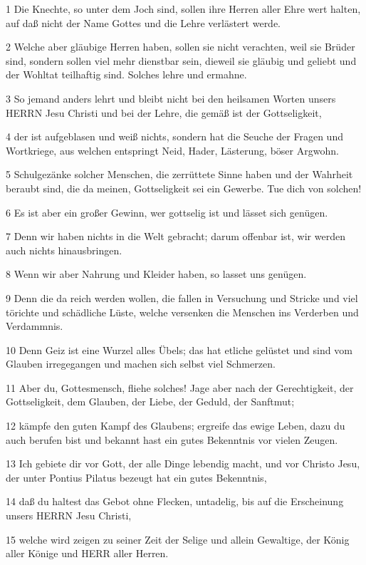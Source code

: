 \par 1 Die Knechte, so unter dem Joch sind, sollen ihre Herren aller Ehre wert halten, auf daß nicht der Name Gottes und die Lehre verlästert werde.
\par 2 Welche aber gläubige Herren haben, sollen sie nicht verachten, weil sie Brüder sind, sondern sollen viel mehr dienstbar sein, dieweil sie gläubig und geliebt und der Wohltat teilhaftig sind. Solches lehre und ermahne.
\par 3 So jemand anders lehrt und bleibt nicht bei den heilsamen Worten unsers HERRN Jesu Christi und bei der Lehre, die gemäß ist der Gottseligkeit,
\par 4 der ist aufgeblasen und weiß nichts, sondern hat die Seuche der Fragen und Wortkriege, aus welchen entspringt Neid, Hader, Lästerung, böser Argwohn.
\par 5 Schulgezänke solcher Menschen, die zerrüttete Sinne haben und der Wahrheit beraubt sind, die da meinen, Gottseligkeit sei ein Gewerbe. Tue dich von solchen!
\par 6 Es ist aber ein großer Gewinn, wer gottselig ist und lässet sich genügen.
\par 7 Denn wir haben nichts in die Welt gebracht; darum offenbar ist, wir werden auch nichts hinausbringen.
\par 8 Wenn wir aber Nahrung und Kleider haben, so lasset uns genügen.
\par 9 Denn die da reich werden wollen, die fallen in Versuchung und Stricke und viel törichte und schädliche Lüste, welche versenken die Menschen ins Verderben und Verdammnis.
\par 10 Denn Geiz ist eine Wurzel alles Übels; das hat etliche gelüstet und sind vom Glauben irregegangen und machen sich selbst viel Schmerzen.
\par 11 Aber du, Gottesmensch, fliehe solches! Jage aber nach der Gerechtigkeit, der Gottseligkeit, dem Glauben, der Liebe, der Geduld, der Sanftmut;
\par 12 kämpfe den guten Kampf des Glaubens; ergreife das ewige Leben, dazu du auch berufen bist und bekannt hast ein gutes Bekenntnis vor vielen Zeugen.
\par 13 Ich gebiete dir vor Gott, der alle Dinge lebendig macht, und vor Christo Jesu, der unter Pontius Pilatus bezeugt hat ein gutes Bekenntnis,
\par 14 daß du haltest das Gebot ohne Flecken, untadelig, bis auf die Erscheinung unsers HERRN Jesu Christi,
\par 15 welche wird zeigen zu seiner Zeit der Selige und allein Gewaltige, der König aller Könige und HERR aller Herren.
